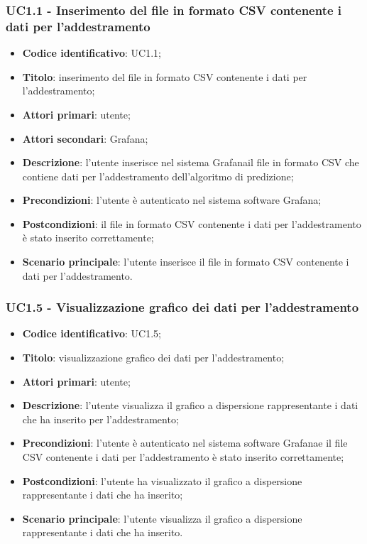 \subsubsection{UC1.1 - Inserimento del file in formato CSV contenente i dati per l'addestramento}
\begin{itemize}
	\item \textbf{Codice identificativo}: UC1.1;
	\item \textbf{Titolo}: inserimento del file in formato CSV contenente i dati per l'addestramento;
	\item \textbf{Attori primari}: utente;
	\item \textbf{Attori secondari}: Grafana\glo;
	\item \textbf{Descrizione}: l'utente inserisce nel sistema Grafana\glosp il file in formato CSV che contiene dati per l'addestramento dell'algoritmo di predizione;
	\item \textbf{Precondizioni}: l'utente è autenticato nel sistema software Grafana\glo;
	\item \textbf{Postcondizioni}: il file in formato CSV contenente i dati per l'addestramento è stato inserito correttamente;
	\item \textbf{Scenario principale}: l'utente inserisce il file in formato CSV contenente i dati per l'addestramento.
\end{itemize}
\subsubsection{UC1.5 - Visualizzazione grafico dei dati per l'addestramento}
\begin{itemize}
	\item \textbf{Codice identificativo}: UC1.5;
	\item \textbf{Titolo}: visualizzazione grafico dei dati per l'addestramento;
	\item \textbf{Attori primari}: utente;
	\item \textbf{Descrizione}: l'utente visualizza il grafico a dispersione rappresentante i dati che ha inserito per l'addestramento;
	\item \textbf{Precondizioni}: l'utente è autenticato nel sistema software Grafana\glosp e il file CSV contenente i dati per l'addestramento è stato inserito correttamente;
	\item \textbf{Postcondizioni}: l'utente ha visualizzato il grafico a dispersione rappresentante i dati che ha inserito;
	\item \textbf{Scenario principale}: l'utente visualizza il grafico a dispersione rappresentante i dati che ha inserito.
\end{itemize}

